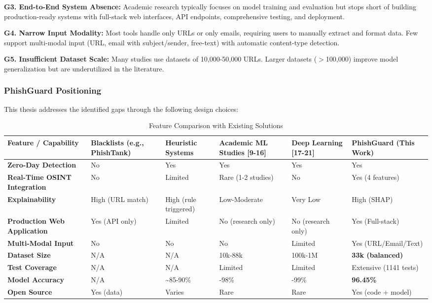 \textbf{G3. End-to-End System Absence:} Academic research typically
focuses on model training and evaluation but stops short of building
production-ready systems with full-stack web interfaces, API endpoints,
comprehensive testing, and deployment.

\textbf{G4. Narrow Input Modality:} Most tools handle only URLs or only
emails, requiring users to manually extract and format data. Few support
multi-modal input (URL, email with subject/sender, free-text) with
automatic content-type detection.

\textbf{G5. Insufficient Dataset Scale:} Many studies use datasets of
10,000-50,000 URLs. Larger datasets ($>$100,000) improve model
generalization but are underutilized in the literature.

\subsubsection{PhishGuard Positioning}\label{phishguard-positioning}

This thesis addresses the identified gaps through the following design
choices:

\setlength{\tabcolsep}{3pt}
\footnotesize
\begin{longtable}{
>{\raggedright\arraybackslash}p{}
>{\raggedright\arraybackslash}p{}
>{\raggedright\arraybackslash}p{}
>{\raggedright\arraybackslash}p{}
>{\raggedright\arraybackslash}p{}
>{\raggedright\arraybackslash}p{}}
\caption{Feature Comparison with Existing Solutions} \\
\toprule
Feature / Capability & Blacklists (e.g., PhishTank) & Heuristic Systems & Academic ML Studies {[}9-16{]} & Deep Learning {[}17-21{]} & \textbf{PhishGuard (This Work)} \\
\midrule

\textbf{Zero-Day Detection} & No & Yes & Yes & Yes & Yes \\
\textbf{Real-Time OSINT Integration} & No & Limited & Rare (1-2 studies)
& No & Yes (4 features) \\
\textbf{Explainability} & High (URL match) & High (rule triggered) &
Low-Moderate & Very Low & High (SHAP) \\
\textbf{Production Web Application} & Yes (API only) & Limited & No
(research only) & No (research only) & Yes (Full-stack) \\
\textbf{Multi-Modal Input} & No & No & No & Limited & Yes
(URL/Email/Text) \\
\textbf{Dataset Size} & N/A & N/A & 10k-88k & 100k-1M & \textbf{33k (balanced)} \\
 \textbf{Test Coverage} & N/A & N/A & Limited & Limited & Extensive (1141
 tests) \\
\textbf{Model Accuracy} & N/A & \textasciitilde85-90\% & 96-98\% &
97-99\% & \textbf{96.45\%} \\
\textbf{Open Source} & Yes (data) & Varies & Rare & Rare & Yes (code +
model) \\

\bottomrule
\end{longtable}
\normalsize

